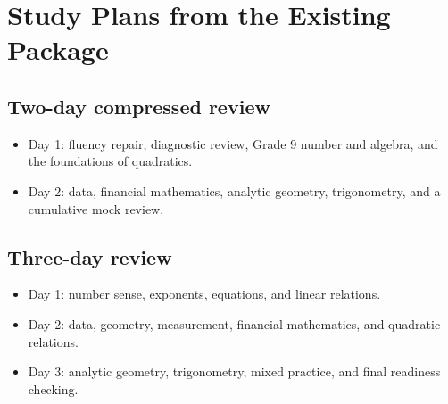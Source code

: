 \documentclass[11pt,oneside]{book}
\begin{document}
\section{Study Plans from the Existing Package}
\subsection*{Two-day compressed review}
\begin{itemize}
  \item Day 1: fluency repair, diagnostic review, Grade 9 number and algebra, and the foundations of quadratics.
  \item Day 2: data, financial mathematics, analytic geometry, trigonometry, and a cumulative mock review.
\end{itemize}

\subsection*{Three-day review}
\begin{itemize}
  \item Day 1: number sense, exponents, equations, and linear relations.
  \item Day 2: data, geometry, measurement, financial mathematics, and quadratic relations.
  \item Day 3: analytic geometry, trigonometry, mixed practice, and final readiness checking.
\end{itemize}
\end{document}
